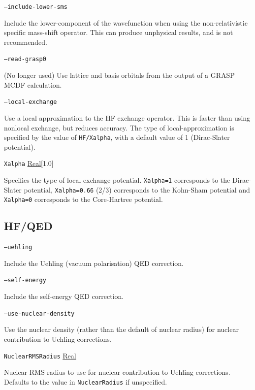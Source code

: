 \documentclass{report}
\begin{document}
\texttt{--include-lower-sms}
\begin{adjustwidth}{1cm}{}
Include the lower-component of the wavefunction when using the non-relativistic specific mass-shift operator.
This can produce unphysical results, and is not recommended.
\end{adjustwidth}

\texttt{--read-grasp0}
\begin{adjustwidth}{1cm}{}
(No longer used) Use lattice and basis orbitals from the output of a GRASP MCDF calculation.
\end{adjustwidth}

\texttt{--local-exchange}
\begin{adjustwidth}{1cm}{}
Use a local approximation to the HF exchange operator. This is faster than using nonlocal exchange, but
reduces accuracy. The type of local-approximation is specified by the value of \texttt{HF/Xalpha}, with
a default value of 1 (Dirac-Slater potential).
\end{adjustwidth}

\texttt{Xalpha} \uline{Real}[1.0]
\begin{adjustwidth}{1cm}{}
Specifies the type of local exchange potential. \texttt{Xalpha=1} corresponds to the Dirac-Slater
potential, \texttt{Xalpha=0.66} (2/3) corresponds to the Kohn-Sham potential and \texttt{Xalpha=0}
corresponds to the Core-Hartree potential.
\end{adjustwidth}

\subsection{HF/QED}
\texttt{--uehling}
\begin{adjustwidth}{1cm}{}
Include the Uehling (vacuum polarisation) QED correction.
\end{adjustwidth}

\texttt{--self-energy}
\begin{adjustwidth}{1cm}{}
Include the self-energy QED correction.
\end{adjustwidth}

\texttt{--use-nuclear-density}
\begin{adjustwidth}{1cm}{}
Use the nuclear density (rather than the default of nuclear radius) for nuclear contribution to Uehling 
corrections.
\end{adjustwidth}

\texttt{NuclearRMSRadius} \uline{Real}
\begin{adjustwidth}{1cm}{}
Nuclear RMS radius to use for nuclear contribution to Uehling corrections. Defaults to the value in 
\texttt{NuclearRadius} if unspecified.
\end{adjustwidth}
\end{document}
